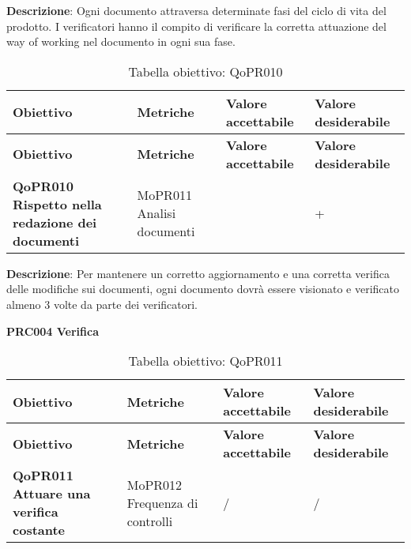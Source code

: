\documentclass[../piano-di-qualifica.tex]{subfiles}
\begin{document}
\textbf{Descrizione}: Ogni documento attraversa determinate fasi del ciclo di vita del prodotto. I verificatori hanno il compito di verificare la corretta attuazione del way of working nel documento in ogni sua fase.

\renewcommand{\arraystretch}{2} %
\begin{longtable}[H]{>{\centering\bfseries}m{5cm} >{\centering}m{5cm} >{\centering}m{2.5cm} >{\centering\arraybackslash}m{2.5cm}}  
    \caption{Tabella obiettivo: QoPR010}%
    \label{tab:obiettivo_qopr010} \\
  \rowcolor{lightgray}
  {\textbf{Obiettivo}} & {\textbf{Metriche}} & {\textbf{Valore accettabile}} & {\textbf{Valore desiderabile}}  \\
  \endfirsthead%
  \rowcolor{lightgray}
  {\textbf{Obiettivo}} & {\textbf{Metriche}} & {\textbf{Valore accettabile}} & {\textbf{Valore desiderabile}}  \\
  \endhead%
  \textbf{QoPR010 Rispetto nella redazione dei documenti} & MoPR011 Analisi documenti & 3 & 4+ \\
\end{longtable}

\textbf{Descrizione}: Per mantenere un corretto aggiornamento e una corretta verifica delle modifiche sui documenti, ogni documento dovrà essere visionato e verificato almeno 3 volte da parte dei verificatori.

        \begin{center}
            \centering
            \textbf{PRC004 Verifica}
        \end{center}

        \renewcommand{\arraystretch}{2} %
        \begin{longtable}[H]{>{\centering\bfseries}m{5cm} >{\centering}m{5cm} >{\centering}m{2.5cm} >{\centering\arraybackslash}m{2.5cm}}  
            \caption{Tabella obiettivo: QoPR011}%
            \label{tab:obiettivo_qopr011} \\
          \rowcolor{lightgray}
          {\textbf{Obiettivo}} & {\textbf{Metriche}} & {\textbf{Valore accettabile}} & {\textbf{Valore desiderabile}}  \\
          \endfirsthead%
          \rowcolor{lightgray}
          {\textbf{Obiettivo}} & {\textbf{Metriche}} & {\textbf{Valore accettabile}} & {\textbf{Valore desiderabile}}  \\
          \endhead%
          \textbf{QoPR011 Attuare una verifica costante} & MoPR012 Frequenza di controlli & / & / \\
        \end{longtable}
        
\end{document}

